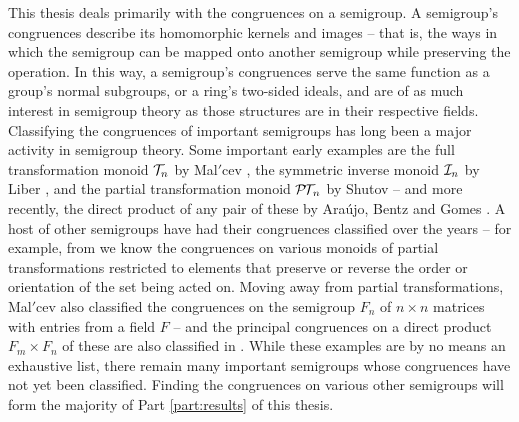 This thesis deals primarily with the congruences on a semigroup.  A semigroup's
congruences describe its homomorphic kernels and images -- that is, the ways in
which the semigroup can be mapped onto another semigroup while preserving the
operation.  In this way, a semigroup's congruences serve the same function as a
group's normal subgroups, or a ring's two-sided ideals, and are of as much
interest in semigroup theory as those structures are in their respective fields.
Classifying the congruences of important semigroups has long been a major
activity in semigroup theory.  Some important early examples are the full
transformation monoid $\mathcal{T}_n$ by Mal$'$cev \cite{malcev_1952}, the symmetric
inverse monoid $\mathcal{I}_n$ by Liber \cite{liber_1953}, and the partial transformation
monoid $\mathcal{P\!T\!}_n$ by Shutov \cite{shutov_1988} -- and more recently, the direct
product of any pair of these by Ara{\'u}jo, Bentz and Gomes \cite{bentz_congs}.
A host of other semigroups have had their congruences classified over the years
-- for example, from \cite{fernandes_2000, lisbon_ii, lisbon_i} we know the
congruences on various monoids of partial transformations restricted to elements
that preserve or reverse the order or orientation of the set being acted on.
Moving away from partial transformations, Mal$'$cev also classified the
congruences on the semigroup $F_n$ of $n \times n$ matrices with entries from a
field $F$ \cite{malcev_matrices} -- and the principal congruences on a direct product
$F_m \times F_n$ of these are also classified in \cite{bentz_congs}.  While
these examples are by no means an exhaustive list, there remain many important
semigroups whose congruences have not yet been classified.  Finding the
congruences on various other semigroups will form the majority of Part
\ref{part:results} of this thesis.

